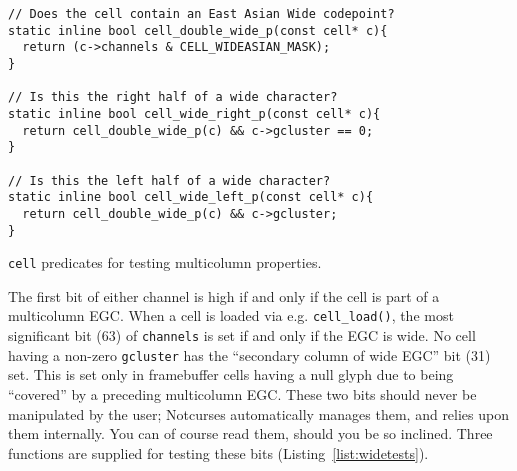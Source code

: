 \begin{listing}[!htb]
\begin{verbatim}
// Does the cell contain an East Asian Wide codepoint?
static inline bool cell_double_wide_p(const cell* c){
  return (c->channels & CELL_WIDEASIAN_MASK);
}

// Is this the right half of a wide character?
static inline bool cell_wide_right_p(const cell* c){
  return cell_double_wide_p(c) && c->gcluster == 0;
}

// Is this the left half of a wide character?
static inline bool cell_wide_left_p(const cell* c){
  return cell_double_wide_p(c) && c->gcluster;
}
\end{verbatim}
\caption{\texttt{cell} predicates for testing multicolumn properties.}
\label{list:widetests}
\end{listing}

The first bit of either channel is high if and only if the cell is part of a
multicolumn EGC. When a cell is loaded via e.g. \texttt{cell\_load()}, the most
significant bit (63) of \texttt{channels} is set if and only if the EGC is wide. No
cell having a non-zero \texttt{gcluster} has the ``secondary column of wide EGC''
bit (31) set. This is set only in framebuffer cells having a null glyph due to
being ``covered'' by a preceding multicolumn EGC. These two bits should never
be manipulated by the user; Notcurses automatically manages them, and relies upon
them internally. You can of course read them, should you be so inclined. Three
functions are supplied for testing these bits (Listing~\ref{list:widetests}).


